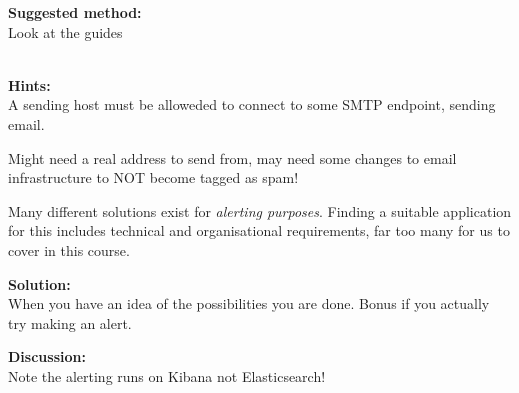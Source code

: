 \documentclass[a4paper,11pt,notitlepage]{report}
\begin{document}
{\bf Suggested method:}\\
Look at the guides\\
\\

{\bf Hints:}\\
A sending host must be alloweded to connect to some SMTP endpoint, sending email.

Might need a real address to send from, may need some changes to email infrastructure to NOT become tagged as spam!

Many different solutions exist for \emph{alerting purposes}. Finding a suitable application for this includes technical and organisational requirements, far too many for us to cover in this course.



{\bf Solution:}\\
When you have an idea of the possibilities you are done. Bonus if you actually try making an alert.

{\bf Discussion:}\\
Note the alerting runs on Kibana not Elasticsearch!
\end{document}
